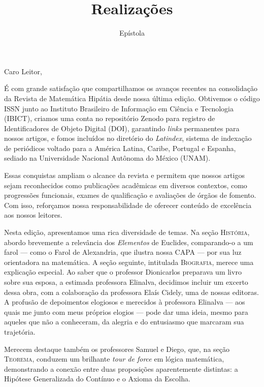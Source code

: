 \documentclass[onecolumn]{hipatia}
\title{Realizações}
\subtitle{Epístola}
\author{}
\begin{document}
\setcounter{page}{\epistolapage}
\maketitle
\leftskip=2.5cm
\rightskip=2.5cm


\noindent Caro Leitor,
\vspace{1cm}

É com grande satisfação que compartilhamos 
os avanços recentes na consolidação da 
Revista de Matemática Hipátia desde nossa 
última edição. Obtivemos o código ISSN 
junto ao Instituto Brasileiro de Informação 
em Ciência e Tecnologia (IBICT), criamos 
uma conta no repositório Zenodo para 
registro de Identificadores de Objeto Digital 
(DOI), garantindo \emph{links} permanentes para 
nossos artigos, e fomos incluídos no 
diretório do \emph{Latindex}, 
sistema de indexação de periódicos voltado 
para a América Latina, Caribe, Portugal e 
Espanha, sediado na Universidade Nacional 
Autônoma do México (UNAM). 

Essas conquistas ampliam o alcance da 
revista e permitem que nossos artigos 
sejam reconhecidos como publicações 
acadêmicas em diversos contextos, 
como progressões funcionais, exames de 
qualificação e avaliações de órgãos de 
fomento. Com isso, reforçamos nossa 
responsabilidade de oferecer conteúdo 
de excelência aos nossos leitores.

Nesta edição, apresentamos uma rica 
diversidade de temas. Na seção \textsc{História}, 
abordo brevemente a relevância dos \emph{Elementos} de 
Euclides, comparando-o a um farol --- 
como o Farol de Alexandria, que ilustra nossa CAPA ---
por sua luz orientadora na matemática. 
A seção seguinte, intitulada \textsc{Biografia}, 
merece uma explicação especial. Ao saber 
que o professor Dionicarlos preparava um 
livro sobre sua esposa, a estimada professora 
Elinalva, decidimos incluir um excerto 
dessa obra, com a colaboração da professora 
Elaís Cidely, uma de nossas editoras. 
A profusão de depoimentos elogiosos e merecidos 
à professora Elinalva 
--- aos quais me junto com meus 
próprios elogios ---
pode dar uma ideia, 
mesmo para aqueles que não a conheceram, 
da alegria e do entusiasmo que marcaram 
sua trajetória.

\pagebreak

Merecem destaque também os professores 
Samuel e Diego, que, na seção \textsc{Teorema}, 
conduzem um brilhante \emph{tour de force} em 
lógica matemática, demonstrando a conexão 
entre duas proposições aparentemente 
distintas: a Hipótese Generalizada do Contínuo 
e o Axioma da Escolha. 
\end{document}
